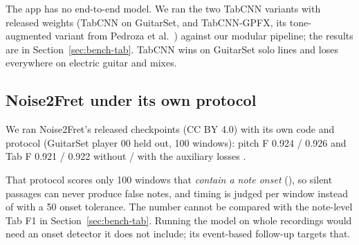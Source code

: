 \begin{inapp}
The app has no end-to-end model. We ran the two TabCNN variants with released
weights (TabCNN on GuitarSet, and TabCNN-GPFX, its tone-augmented variant from
Pedroza et al.~\cite{pedroza2024tones}) against our modular pipeline; the
results are in Section~\ref{sec:bench-tab}. TabCNN wins on GuitarSet solo lines
and loses everywhere on electric guitar and mixes.
\end{inapp}

\subsection{Noise2Fret under its own protocol}

We ran Noise2Fret's released checkpoints (CC BY 4.0) with its own code and
protocol (GuitarSet player 00 held out, 100\ms{} windows): pitch F 0.924 / 0.926
and Tab F 0.921 / 0.922 without / with the auxiliary losses \measured.

\begin{caution}
That protocol scores only 100\ms{} windows that \emph{contain a note onset}
(), so silent passages can never produce false notes, and
timing is judged per window instead of with a 50\ms{} onset tolerance. The number
cannot be compared with the note-level Tab F1 in Section~\ref{sec:bench-tab}.
Running the model on whole recordings would need an onset detector it does not
include; its event-based follow-up targets that.
\end{caution}
